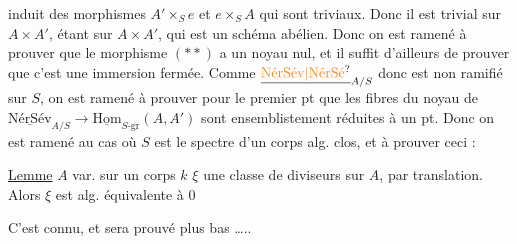 induit des morphismes  $A'\times_S e$ et $e\times_S A$ qui sont triviaux. Donc il est trivial sur  $A\times A'$,  étant  sur $A\times A'$, qui est un schéma abélien.
Donc on est ramené à prouver que le morphisme $(**)$  a un noyau nul, et il suffit d'ailleurs de prouver que  c'est une immersion fermée. Comme $\underline{\text{\unsure{NérSév|NérSé}}}_{A/S}$  donc   est non ramifié sur $S$, on est ramené à prouver  pour le premier pt que les fibres du noyau de $\underline{\text{NérSév}}_{A/S}\to\underline{\mathrm{Hom}}_{S\text{-gr}}(A,A')$ sont ensemblistement réduites à un pt. Donc on est ramené au cas où $S$ est le spectre d'un corps alg. clos, et à prouver ceci :

\noindent\llap{\smash{\rule[-3.7ex]{0.4pt}{4.2ex}}\quad}\uline{Lemme} $A$ var.  sur un corps $k$  $\xi$ une classe de diviseurs sur $A$,  par translation. Alors $\xi$ est alg. équivalente à $0$

C'est connu, et sera prouvé plus bas \ldots..

